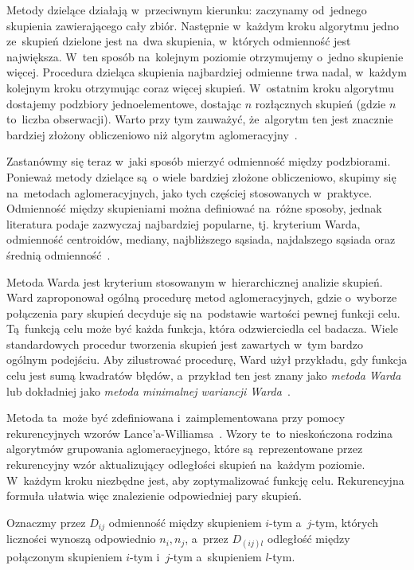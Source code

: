 \documentclass{praca1}
\begin{document}
Metody dzielące działają w~przeciwnym kierunku: zaczynamy od~jednego skupienia zawierającego cały zbiór. Następnie w~każdym kroku algorytmu jedno ze~skupień dzielone jest na~dwa skupienia, w~których odmienność jest największa. W~ten sposób na~kolejnym poziomie otrzymujemy o~jedno skupienie więcej. Procedura dzieląca skupienia najbardziej odmienne trwa nadal, w~każdym kolejnym kroku otrzymując coraz więcej skupień. W~ostatnim kroku algorytmu dostajemy podzbiory jednoelementowe, dostając $n$ rozłącznych skupień (gdzie $n$ to~liczba obserwacji). Warto przy tym zauważyć, że~algorytm ten jest znacznie bardziej złożony obliczeniowo niż algorytm aglomeracyjny~\cite{Hastie2009:elements, Koronacki2005:statystyczne}.

Zastanówmy się teraz w~jaki sposób mierzyć odmienność między podzbiorami. Ponieważ metody dzielące są~o wiele bardziej złożone obliczeniowo, skupimy się na~metodach aglomeracyjnych, jako tych częściej stosowanych w~praktyce. Odmienność między skupieniami można definiować na~różne sposoby, jednak literatura podaje zazwyczaj najbardziej popularne, tj. kryterium Warda, odmienność centroidów, mediany, najbliższego sąsiada, najdalszego sąsiada oraz średnią odmienność~\cite{Hastie2009:elements, Koronacki2005:statystyczne}.

Metoda Warda jest kryterium stosowanym w~hierarchicznej analizie skupień. Ward zaproponował ogólną procedurę metod aglomeracyjnych, gdzie o~wyborze połączenia pary skupień decyduje się na~podstawie wartości pewnej funkcji celu. Tą~funkcją celu może być każda funkcja, która odzwierciedla cel badacza. Wiele standardowych procedur tworzenia skupień jest zawartych w~tym bardzo ogólnym podejściu. Aby zilustrować procedurę, Ward użył przykładu, gdy funkcja celu jest sumą kwadratów błędów, a~przykład ten jest znany jako \emph{metoda Warda} lub dokładniej jako \emph{metoda minimalnej wariancji Warda}~\cite{Ward1963:hierarchical}.

Metoda ta~może być zdefiniowana i~zaimplementowana przy pomocy rekurencyjnych wzorów Lance'a-Williamsa~\cite{Lance1967:hierarchical}. Wzory te~to nieskończona rodzina algorytmów grupowania aglomeracyjnego, które są~reprezentowane przez rekurencyjny wzór aktualizujący odległości skupień na~każdym poziomie. W~każdym kroku niezbędne jest, aby zoptymalizować funkcję celu. Rekurencyjna formuła ułatwia więc znalezienie odpowiedniej pary skupień.	

Oznaczmy przez $D_{ij}$ odmienność między skupieniem $i$-tym a~$j$-tym, których liczności wynoszą odpowiednio $n_i, n_j$, a~przez $D_{(ij)l}$ odległość między połączonym skupieniem $i$-tym i~$j$-tym a~skupieniem $l$-tym.
\end{document}
